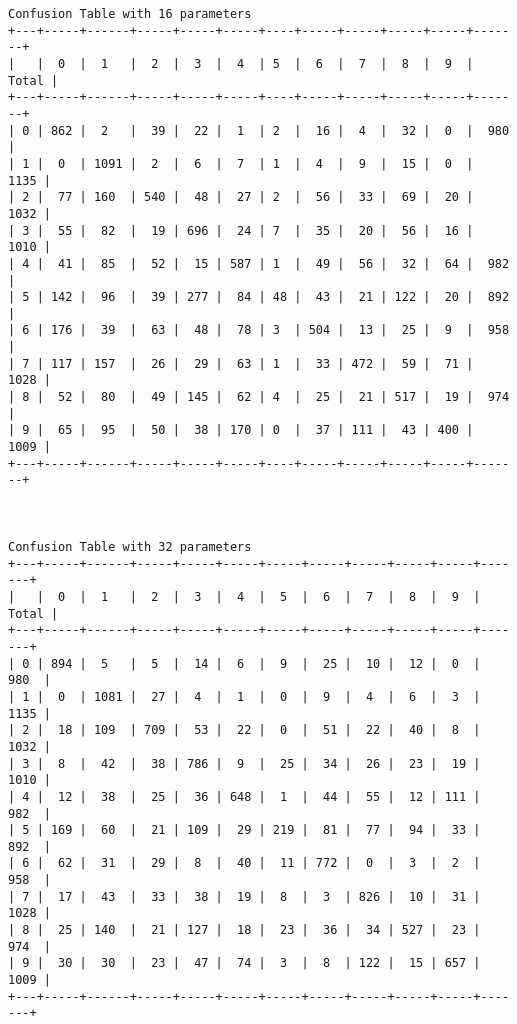 \documentclass[11pt]{article}
\begin{document}
\begin{Verbatim}[commandchars=\\\{\}]
Confusion Table with 16 parameters
+---+-----+------+-----+-----+-----+----+-----+-----+-----+-----+-------+
|   |  0  |  1   |  2  |  3  |  4  | 5  |  6  |  7  |  8  |  9  | Total |
+---+-----+------+-----+-----+-----+----+-----+-----+-----+-----+-------+
| 0 | 862 |  2   |  39 |  22 |  1  | 2  |  16 |  4  |  32 |  0  |  980  |
| 1 |  0  | 1091 |  2  |  6  |  7  | 1  |  4  |  9  |  15 |  0  |  1135 |
| 2 |  77 | 160  | 540 |  48 |  27 | 2  |  56 |  33 |  69 |  20 |  1032 |
| 3 |  55 |  82  |  19 | 696 |  24 | 7  |  35 |  20 |  56 |  16 |  1010 |
| 4 |  41 |  85  |  52 |  15 | 587 | 1  |  49 |  56 |  32 |  64 |  982  |
| 5 | 142 |  96  |  39 | 277 |  84 | 48 |  43 |  21 | 122 |  20 |  892  |
| 6 | 176 |  39  |  63 |  48 |  78 | 3  | 504 |  13 |  25 |  9  |  958  |
| 7 | 117 | 157  |  26 |  29 |  63 | 1  |  33 | 472 |  59 |  71 |  1028 |
| 8 |  52 |  80  |  49 | 145 |  62 | 4  |  25 |  21 | 517 |  19 |  974  |
| 9 |  65 |  95  |  50 |  38 | 170 | 0  |  37 | 111 |  43 | 400 |  1009 |
+---+-----+------+-----+-----+-----+----+-----+-----+-----+-----+-------+



Confusion Table with 32 parameters
+---+-----+------+-----+-----+-----+-----+-----+-----+-----+-----+-------+
|   |  0  |  1   |  2  |  3  |  4  |  5  |  6  |  7  |  8  |  9  | Total |
+---+-----+------+-----+-----+-----+-----+-----+-----+-----+-----+-------+
| 0 | 894 |  5   |  5  |  14 |  6  |  9  |  25 |  10 |  12 |  0  |  980  |
| 1 |  0  | 1081 |  27 |  4  |  1  |  0  |  9  |  4  |  6  |  3  |  1135 |
| 2 |  18 | 109  | 709 |  53 |  22 |  0  |  51 |  22 |  40 |  8  |  1032 |
| 3 |  8  |  42  |  38 | 786 |  9  |  25 |  34 |  26 |  23 |  19 |  1010 |
| 4 |  12 |  38  |  25 |  36 | 648 |  1  |  44 |  55 |  12 | 111 |  982  |
| 5 | 169 |  60  |  21 | 109 |  29 | 219 |  81 |  77 |  94 |  33 |  892  |
| 6 |  62 |  31  |  29 |  8  |  40 |  11 | 772 |  0  |  3  |  2  |  958  |
| 7 |  17 |  43  |  33 |  38 |  19 |  8  |  3  | 826 |  10 |  31 |  1028 |
| 8 |  25 | 140  |  21 | 127 |  18 |  23 |  36 |  34 | 527 |  23 |  974  |
| 9 |  30 |  30  |  23 |  47 |  74 |  3  |  8  | 122 |  15 | 657 |  1009 |
+---+-----+------+-----+-----+-----+-----+-----+-----+-----+-----+-------+




\end{Verbatim}
\end{document}
